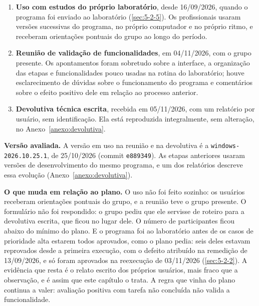 \begin{enumerate}
\item \textbf{Uso com estudos do próprio laboratório}, desde 16/09/2026, quando o programa foi enviado ao laboratório (\ref{sec:5-2-5}). Os profissionais usaram versões sucessivas do programa, no próprio computador e no próprio ritmo, e receberam orientações pontuais do grupo ao longo do período.
\item \textbf{Reunião de validação de funcionalidades}, em 04/11/2026, com o grupo presente. Os apontamentos foram sobretudo sobre a interface, a organização das etapas e funcionalidades pouco usadas na rotina do laboratório; houve esclarecimento de dúvidas sobre o funcionamento do programa e comentários sobre o efeito positivo dele em relação ao processo anterior.
\item \textbf{Devolutiva técnica escrita}, recebida em 05/11/2026, com um relatório por usuário, sem identificação. Ela está reproduzida integralmente, sem alteração, no Anexo~\ref{anexo:devolutiva}.
\end{enumerate}


\textbf{Versão avaliada.} A versão em uso na reunião e na devolutiva é a \texttt{windows-\allowbreak{}2026.\allowbreak{}10.\allowbreak{}25.\allowbreak{}1}, de 25/10/2026 (commit \texttt{e889349}). As etapas anteriores usaram versões de desenvolvimento do mesmo programa, e um dos relatórios descreve essa evolução (Anexo~\ref{anexo:devolutiva}).


\textbf{O que muda em relação ao plano.} O uso não foi feito sozinho: os usuários receberam orientações pontuais do grupo, e a reunião teve o grupo presente. O formulário não foi respondido: o grupo pediu que ele servisse de roteiro para a devolutiva escrita, que ficou no lugar dele. O número de participantes ficou abaixo do mínimo do plano. E o programa foi ao laboratório antes de os casos de prioridade alta estarem todos aprovados, como o plano pedia: seis deles estavam reprovados desde a primeira execução, com o defeito atribuído na remedição de 13/09/2026, e só foram aprovados na reexecução de 03/11/2026 (\ref{sec:5-2-2}). A evidência que resta é o relato escrito dos próprios usuários, mais fraco que a observação, e é assim que este capítulo o trata. A regra que vinha do plano continua a valer: avaliação positiva com tarefa não concluída não valida a funcionalidade.

